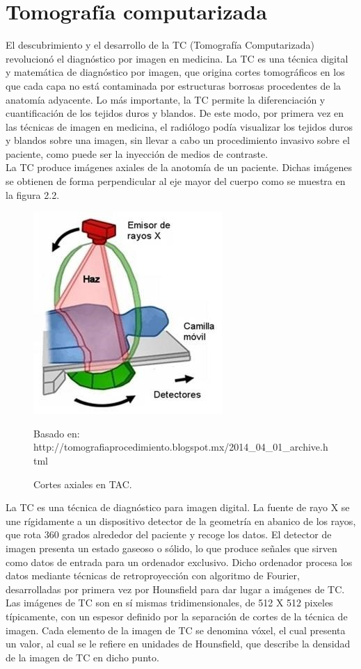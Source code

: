 \documentclass[12pt]{report}
\begin{document}
\section{Tomografía computarizada}
El descubrimiento y el desarrollo de la TC (Tomografía Computarizada) revolucionó el diagnóstico por imagen en medicina. La TC es una técnica digital y matemática de diagnóstico por imagen, que origina cortes tomográficos en los que cada capa no está contaminada por estructuras borrosas procedentes de la anatomía adyacente. Lo más importante, la TC permite la diferenciación y cuantificación de los tejidos duros y blandos. De este modo, por primera vez en las técnicas de imagen en medicina, el radiólogo podía visualizar los tejidos duros y blandos sobre una imagen, sin llevar a cabo un procedimiento invasivo sobre el paciente, como puede ser la inyección de medios de contraste.\\
La TC produce imágenes axiales de la anotomía de un paciente. Dichas imágenes se obtienen de forma perpendicular al eje mayor del cuerpo como se muestra en la figura 2.2.

\begin{figure}[H]
\centering
\includegraphics[width = 5 cm, height = 5 cm]{tac}
\caption{Cortes axiales en TAC.}
Basado en: http://tomografiaprocedimiento.blogspot.mx/2014_04_01_archive.html
\end{figure}

 La TC es una técnica de diagnóstico para imagen digital. La fuente de rayo X se une rígidamente a un dispositivo detector de la geometría en abanico de los rayos, que rota 360 grados alrededor del paciente y recoge los datos. El detector de imagen presenta un estado gaseoso o sólido, lo que produce señales que sirven como datos de entrada para un ordenador exclusivo. Dicho ordenador procesa los datos mediante técnicas de retroproyección con algoritmo de Fourier, desarrolladas por primera vez por Hounsfield para dar lugar a imágenes de TC. Las imágenes de TC son en sí mismas tridimensionales, de 512 X 512 pixeles típicamente, con un espesor definido por la separación de cortes de la técnica de imagen. Cada elemento de la imagen de TC se denomina vóxel, el cual presenta un valor, al cual se le refiere en unidades de Hounsfield, que describe la densidad de la imagen de TC en dicho punto.\cite{prote}\\
 
\end{document}
